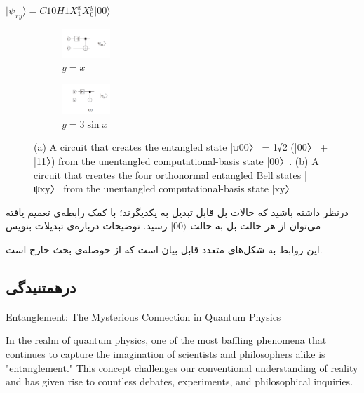 \documentclass{book}
\begin{document}
\begin{center}
$\vert \psi_{xy}\rangle = C10H1X^{x}_{1} X^{y}_{0} \vert00\rangle$\\
\end{center}

\begin{figure}
	\centering
	\begin{subfigure}[b]{}
		\centering
		\includegraphics[width=0.2\textwidth]{psi00.png}
		\caption{$y=x$}
		\label{fig:y equals x}
	\end{subfigure}
	\hfill
	\begin{subfigure}[b]{}
		\centering
		\includegraphics[width=0.2\textwidth]{psixy.png}
		\caption{$y=3\sin x$}
		\label{fig:three sin x}
	\end{subfigure}
	\caption{(a) A circuit that creates the entangled state
		|ψ00〉 = 1√2
		(|00〉 + |11〉) from the unentangled computational-basis
		state |00〉. (b) A circuit that creates the four orthonormal entangled
		Bell states |ψxy〉 from the unentangled computational-basis state |xy〉}
	\label{fig:three graphs}
\end{figure}


درنظر داشته باشید که حالات بل قابل تبدیل به یکدیگرند؛ با کمک رابطه‌ی تعمیم یافته ‌می‌توان از هر حالت بل به حالت $\vert00 \rangle$ رسید.
توضیحات درباره‌ی تبدیلات بنویس

این روابط به شکل‌های متعدد قابل بیان است که از حوصله‌ی بحث خارج است.
\newpage






\subsection{درهمتنیدگی}

Entanglement: The Mysterious Connection in Quantum Physics

In the realm of quantum physics, one of the most baffling phenomena that continues to capture the imagination of scientists and philosophers alike is "entanglement." This concept challenges our conventional understanding of reality and has given rise to countless debates, experiments, and philosophical inquiries.
\end{document}
